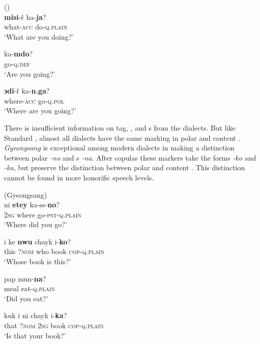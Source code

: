 \ea%
    \label{ex:kore:22}
     ()\\
    \ea
    \gll \textbf{{misi}}-ř    ha-\textbf{{ja}}?\\
    what-\textsc{acc}  do-\textsc{q}.\textsc{plain}\\
    \glt ‘What are you doing?’
    
    \ex
    \gll ka-\textbf{{mdo}}?\\
    go-\textsc{q}.\textsc{def}\\
    \glt ‘Are you going?’
    
    \ex
    \gll \textbf{{ɔdi}}-ř    ka-\textbf{{n.ga}}?\\
    where-\textsc{acc}  go-\textsc{q}.\textsc{pol}\\
    \glt ‘Where are you going?’ \citep[243, 262]{King1987}
    \z
    \z 

There is insufficient information on tag, , and s from the dialects. But like Standard , almost all dialects have the same marking in polar and content . \textit{Gyeongsang} is exceptional among modern dialects in making a distinction between polar \textit{-no} and s \textit{-na}. After copulas these markers take the forms \textit{-ko} and \textit{-ka}, but preserve the distinction between polar and content . This distinction cannot be found in more honorific speech levels.

\ea%
    \label{ex:kore:23}
     (Gyeongsang)\\
    \ea
    \gll ni \textbf{{etey}} ka-ss-\textbf{{no}}?\\
    2\textsc{sg}  where  go-\textsc{pst}-\textsc{q}.\textsc{plain}\\
    \glt ‘Where did you go?’
    
    \ex
    \gll i  ke \textbf{{nwu}} chayk  i-\textbf{{ko}}?\\
    this  ?\textsc{nom}  who  book  \textsc{cop}-\textsc{q}.\textsc{plain}\\
    \glt ‘Whose book is this?’
    
    \ex
    \gll pap  mun-\textbf{{na}}?\\
    meal  eat-\textsc{q}.\textsc{plain}\\
    \glt ‘Did you eat?’
    
    \ex
    \gll kuk  i  ni  chayk  i-\textbf{{ka}}?\\
    that  ?\textsc{nom}  2\textsc{sg}  book  \textsc{cop}-\textsc{q}.\textsc{plain}\\
    \glt ‘Is that your book?’ \citep[72]{Sohn1999}
    \z
    \z

